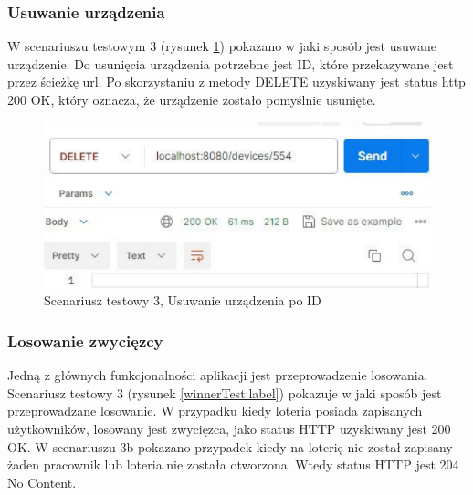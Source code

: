 \subsubsection{Usuwanie urządzenia}
W scenariuszu testowym 3 (rysunek \ref{deleteTest:label}) pokazano w jaki sposób jest usuwane urządzenie. Do usunięcia urządzenia potrzebne jest ID, które przekazywane jest przez ścieżkę url. Po skorzystaniu z metody DELETE uzyskiwany jest status http 200 OK, który oznacza, że urządzenie zostało pomyślnie usunięte.


\begin{figure}[h]
		\centering
    \includegraphics[width=0.48\linewidth]{rys06/postmanTest/delete.pdf}
    \caption{Scenariusz testowy 3, Usuwanie urządzenia po ID}
    \label{deleteTest:label}
\end{figure}


\subsubsection{Losowanie zwycięzcy}

Jedną z głównych funkcjonalności aplikacji jest przeprowadzenie losowania. Scenariusz testowy 3 (rysunek \ref{winnerTest:label}) pokazuje w jaki sposób jest przeprowadzane losowanie. W przypadku kiedy loteria posiada zapisanych użytkowników, losowany jest zwycięzca, jako status HTTP uzyskiwany jest 200 OK. W scenariuszu 3b pokazano przypadek kiedy na loterię nie został zapisany żaden pracownik lub loteria nie została otworzona. Wtedy status HTTP jest 204 No Content. 


